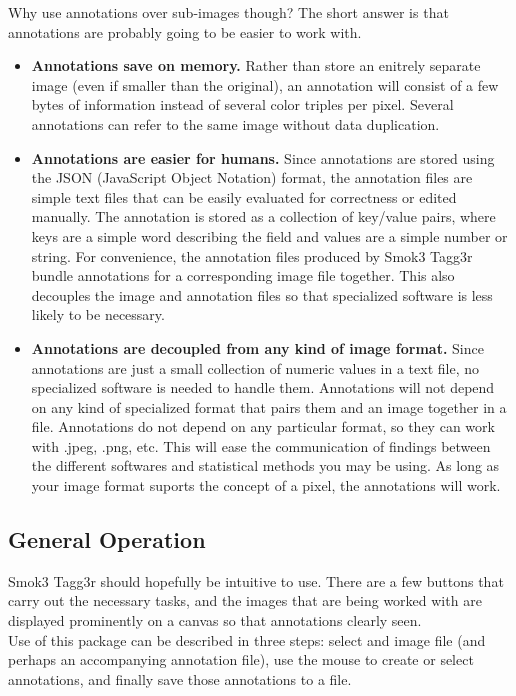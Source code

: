\documentclass{article}
\begin{document}
Why use annotations over sub-images though? The short answer is that annotations are probably going to be easier to work with.
\begin{itemize}
  \item \textbf{Annotations save on memory.} Rather than store an enitrely separate image (even if smaller than the original), an annotation will consist of a few bytes of information instead of several color triples per pixel. Several annotations can refer to the same image without data duplication.

  \item \textbf{Annotations are easier for humans.} Since annotations are stored using the JSON (JavaScript Object Notation) format, the annotation files are simple text files that can be easily evaluated for correctness or edited manually. The annotation is stored as a collection of key/value pairs, where keys are a simple word describing the field and values are a simple number or string. For convenience, the annotation files produced by Smok3 Tagg3r bundle annotations for a corresponding image file together. This also decouples the image and annotation files so that specialized software is less likely to be necessary. 

  \item \textbf{Annotations are decoupled from any kind of image format.} Since annotations are just a small collection of numeric values in a text file, no specialized software is needed to handle them. Annotations will not depend on any kind of specialized format that pairs them and an image together in a file. Annotations do not depend on any particular format, so they can work with .jpeg, .png, etc. This will ease the communication of findings between the different softwares and statistical methods you may be using. As long as your image format suports the concept of a pixel, the annotations will work.
\end{itemize}

\subsection{General Operation}
Smok3 Tagg3r should hopefully be intuitive to use. There are a few buttons that carry out the necessary tasks, and the images that are being worked with are displayed prominently on a canvas so that annotations clearly seen.\\

Use of this package can be described in three steps: select and image file (and perhaps an accompanying annotation file), use the mouse to create or select annotations, and finally save those annotations to a file.
\end{document}
